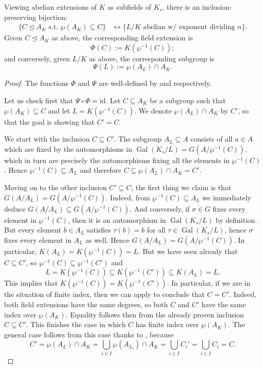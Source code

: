 \documentclass[12pt]{amsart}
\DeclareMathOperator{\Gal}{Gal}
\newcommand{\id}{\mathrm{id}}
\begin{document}
\begin{thm}
    Viewing abelian extensions of $K$ as subfields of $K_{s}$, there is an inclusion-preserving bijection:
    \begin{align*}
	\{ C\trianglelefteq A_{K} \text{ s.t. } \wp(A_{K})\subseteq C \} & \leftrightarrow \{ L/K \text{ abelian w/ exponent dividing } n\}.
    \end{align*}
    Given $C\trianglelefteq A_{K}$ as above, the corresponding field extension is
    \[ \Phi(C):=K(\wp^{-1}(C)); \]
    and conversely, given $L/K$ as above, the corresponding subgroup is
    \[ \Psi(L):=\wp(A_{L})\cap A_{K}. \]
    \begin{proof}
	The functions $\Phi$ and $\Psi$ are well-defined by  and  respectively.

	Let us check first that $\Psi\circ \Phi=\id$.
	Let $C\subseteq A_{K}$ be a subgroup such that $\wp(A_{K})\subseteq C$ and let $L=K(\wp^{-1}(C))$.
	We denote $\wp(A_{L})\cap A_{K}$ by $C'$, so that the goal is showing that $C'=C$.

	We start with the inclusion $C\subseteq C'$.
	The subgroup $A_{L}\subseteq A$ consists of all $a\in A$ which are fixed by the automorphisms in $\Gal(K_{s}/L)=G(A/\wp^{-1}(C))$, which in turn are precisely the automorphisms fixing all the elements in $\wp^{-1}(C)$.
	Hence $\wp^{-1}(C)\subseteq A_{L}$ and therefore $C\subseteq \wp(A_{L})\cap A_{K}=C'$.

	Moving on to the other inclusion $C'\subseteq C$, the first thing we claim is that $G(A/A_{L})=G(A/\wp^{-1}(C))$.
	Indeed, from $\wp^{-1}(C)\subseteq A_{L}$ we immediately deduce $G(A/A_{L})\subseteq G(A/\wp^{-1}(C))$.
	And conversely, if $\sigma\in G$ fixes every element in $\wp^{-1}(C)$, then it is an automorphism in $\Gal(K_{s}/L)$ by definition.
	But every element $b\in A_{L}$ satisfies $\tau(b)=b$ for all $\tau\in \Gal(K_{s}/L)$, hence $\sigma$ fixes every element in $A_{L}$ as well.
	Hence $G(A/A_{L})=G(A/\wp^{-1}(C))$.
	In particular, $K(A_{L})=K(\wp^{-1}(C))=L$.
	But we have seen already that $C\subseteq C'$, so $\wp^{-1}(C)\subseteq \wp^{-1}(C')$ and
	\[ L=K(\wp^{-1}(C))\subseteq K(\wp^{-1}(C'))\subseteq K(A_{L})=L. \]
	This implies that $K(\wp^{-1}(C))=K(\wp^{-1}(C'))$.
	In particular, if we are in the situation of finite index, then we can apply  to conclude that $C=C'$.
	Indeed, both field extensions have the same degrees, so both $C$ and $C'$ have the same index over $\wp(A_{K})$.
	Equality follows then from the already proven inclusion $C\subseteq C'$.
	This finishes the case in which $C$ has finite index over $\wp(A_{K})$.
	The general case follows from this case thanks to , because
	\[ C'=\wp(A_{L})\cap A_{K}=\bigcup_{i\in I}\wp(A_{L_{i}})\cap A_{K}=\bigcup_{i\in I}C_{i}'=\bigcup_{i\in I}C_{i}=C. \]
    \end{proof}
\end{thm}

\newpage


\vfill
\end{document}
